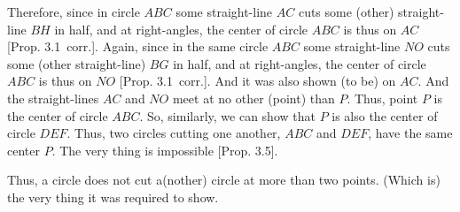 \begin{Parallel}{}{}
{\epsfysize=2.2in
\centerline{}

Therefore, since in circle $ABC$ some straight-line $AC$ cuts some (other)
straight-line $BH$ in half, and at right-angles, the center of circle $ABC$
is thus on $AC$ [Prop. 3.1~corr.]. Again, since in the same circle $ABC$
some straight-line $NO$ cuts some (other straight-line) $BG$ in half, and
at right-angles, the center of circle $ABC$ is thus on $NO$ [Prop. 3.1~corr.].
And it was also shown (to be) on $AC$. And the straight-lines $AC$ and $NO$
meet at no other (point) than $P$. Thus, point $P$ is the center of circle $ABC$.
So, similarly, we can show that $P$ is also the center of circle $DEF$.
Thus,  two circles cutting one another, $ABC$ and $DEF$, have the same center
$P$. The very thing is impossible [Prop. 3.5].

Thus, a circle does not cut a(nother) circle at more than two points. (Which is)
the very thing it was required to show.}
\end{Parallel}

